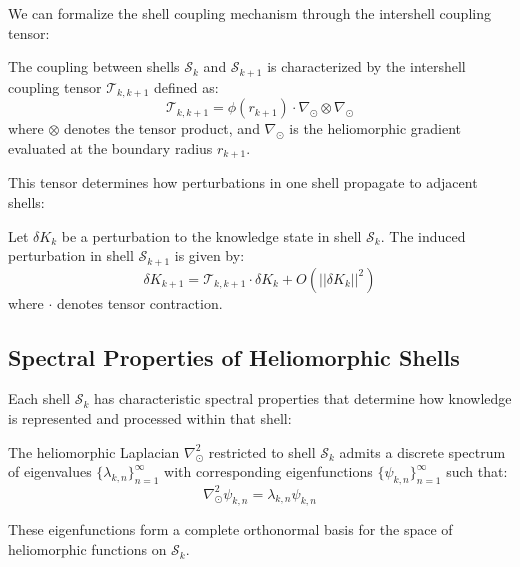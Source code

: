 We can formalize the shell coupling mechanism through the intershell coupling tensor:

\begin{definition}
The coupling between shells $\mathcal{S}_k$ and $\mathcal{S}_{k+1}$ is characterized by the intershell coupling tensor $\mathcal{T}_{k,k+1}$ defined as:
\begin{equation}
\mathcal{T}_{k,k+1} = \phi(r_{k+1}) \cdot \nabla_{\odot} \otimes \nabla_{\odot}
\end{equation}
where $\otimes$ denotes the tensor product, and $\nabla_{\odot}$ is the heliomorphic gradient evaluated at the boundary radius $r_{k+1}$.
\end{definition}

This tensor determines how perturbations in one shell propagate to adjacent shells:

\begin{theorem}
Let $\delta K_k$ be a perturbation to the knowledge state in shell $\mathcal{S}_k$. The induced perturbation in shell $\mathcal{S}_{k+1}$ is given by:
\begin{equation}
\delta K_{k+1} = \mathcal{T}_{k,k+1} \cdot \delta K_k + O(||\delta K_k||^2)
\end{equation}
where $\cdot$ denotes tensor contraction.
\end{theorem}

\subsection{Spectral Properties of Heliomorphic Shells}

Each shell $\mathcal{S}_k$ has characteristic spectral properties that determine how knowledge is represented and processed within that shell:

\begin{theorem}
The heliomorphic Laplacian $\nabla_{\odot}^2$ restricted to shell $\mathcal{S}_k$ admits a discrete spectrum of eigenvalues $\{\lambda_{k,n}\}_{n=1}^{\infty}$ with corresponding eigenfunctions $\{\psi_{k,n}\}_{n=1}^{\infty}$ such that:
\begin{equation}
\nabla_{\odot}^2 \psi_{k,n} = \lambda_{k,n} \psi_{k,n}
\end{equation}

These eigenfunctions form a complete orthonormal basis for the space of heliomorphic functions on $\mathcal{S}_k$.
\end{theorem}

